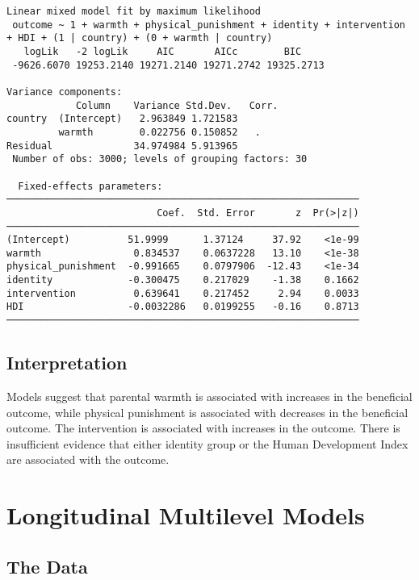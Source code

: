 \documentclass[
  letterpaper,
  DIV=11,
  numbers=noendperiod]{scrreprt}
\begin{document}
\begin{verbatim}
Linear mixed model fit by maximum likelihood
 outcome ~ 1 + warmth + physical_punishment + identity + intervention + HDI + (1 | country) + (0 + warmth | country)
   logLik   -2 logLik     AIC       AICc        BIC    
 -9626.6070 19253.2140 19271.2140 19271.2742 19325.2713

Variance components:
            Column    Variance Std.Dev.   Corr.
country  (Intercept)   2.963849 1.721583
         warmth        0.022756 0.150852   .  
Residual              34.974984 5.913965
 Number of obs: 3000; levels of grouping factors: 30

  Fixed-effects parameters:
─────────────────────────────────────────────────────────────
                          Coef.  Std. Error       z  Pr(>|z|)
─────────────────────────────────────────────────────────────
(Intercept)          51.9999      1.37124     37.92    <1e-99
warmth                0.834537    0.0637228   13.10    <1e-38
physical_punishment  -0.991665    0.0797906  -12.43    <1e-34
identity             -0.300475    0.217029    -1.38    0.1662
intervention          0.639641    0.217452     2.94    0.0033
HDI                  -0.0032286   0.0199255   -0.16    0.8713
─────────────────────────────────────────────────────────────
\end{verbatim}

\section{Interpretation}\label{interpretation-2}

Models suggest that parental warmth is associated with increases in the
beneficial outcome, while physical punishment is associated with
decreases in the beneficial outcome. The intervention is associated with
increases in the outcome. There is insufficient evidence that either
identity group or the Human Development Index are associated with the
outcome.


\chapter{Longitudinal Multilevel
Models}\label{longitudinal-multilevel-models}

\section{The Data}\label{the-data}
\end{document}
